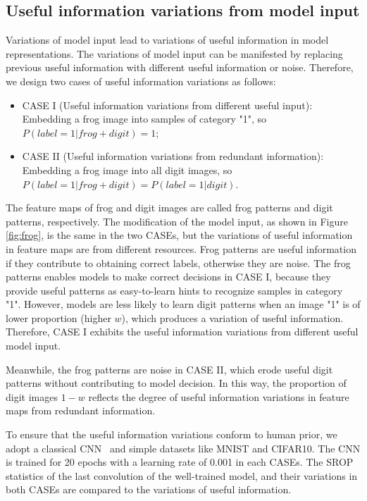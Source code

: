 \documentclass{article}
\begin{document}
\subsection{Useful information variations from model input}
\label{subsec:ui_var_input}
Variations of model input lead to variations of useful information in model representations. The variations of model input can be manifested by replacing previous useful information with different useful information or noise. Therefore, we design two cases of useful information variations as follows:
\begin{itemize}
    \item CASE I (Useful information variations from  different useful input): Embedding a frog image into samples of category "1", so $P(label=1|frog+digit)=1$;
    \item CASE II (Useful information variations from redundant information): Embedding a frog image into all digit images, so $P(label=1|frog+digit)=P(label=1|digit)$.
\end{itemize}
The feature maps of frog and digit images are called frog patterns and digit patterns, respectively. The modification of the model input, as shown in Figure \ref{fig:frog}, is the same in the two CASEs, but the variations of useful information in feature maps are from different resources. Frog patterns are useful information if they contribute to obtaining correct labels, otherwise they are noise. The frog patterns enables models to make correct decisions in CASE I, because they provide useful patterns as easy-to-learn hints to recognize samples in category "1". However, models are less likely to learn digit patterns when an image "1" is of lower proportion (higher $w$), which produces a variation of useful information. Therefore, CASE I exhibits the useful information variations from different useful model input. 

Meanwhile, the frog patterns are noise in CASE II, which erode useful digit patterns without contributing to model decision. In this way, the proportion of digit images $1-w$ reflects the degree of useful information variations in feature maps from redundant information. 

To ensure that the useful information variations conform to human prior, we adopt a classical CNN ~\cite{input_model}and simple datasets like MNIST and CIFAR10. The CNN is trained for 20 epochs with a learning rate of 0.001 in each CASEs. The SROP statistics of the last convolution of the well-trained model, and their variations in both CASEs are compared to the variations of useful information.
\end{document}
